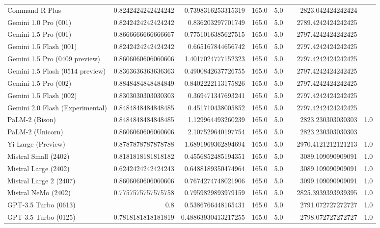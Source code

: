 \begin{table}[htp]
{\begin{tabular}{lrrrrrrr}
Command R Plus & 0.8242424242424242 & 0.7398316253315319 & 165.0 & 5.0 &  & 2823.042424242424 &  \\
Gemini 1.0 Pro (001) & 0.8242424242424242 & 0.836203297701749 & 165.0 & 5.0 &  & 2789.4242424242425 &  \\
Gemini 1.5 Pro (001) & 0.8666666666666667 & 0.7751016385627515 & 165.0 & 5.0 &  & 2797.4242424242425 &  \\
Gemini 1.5 Flash (001) & 0.8242424242424242 & 0.665167844656742 & 165.0 & 5.0 &  & 2797.4242424242425 &  \\
Gemini 1.5 Pro (0409 preview) & 0.8606060606060606 & 1.4017024777152323 & 165.0 & 5.0 &  & 2797.4242424242425 &  \\
Gemini 1.5 Flash (0514 preview) & 0.8363636363636363 & 0.4900842637726755 & 165.0 & 5.0 &  & 2797.4242424242425 &  \\
Gemini 1.5 Pro (002) & 0.8848484848484849 & 0.8402222113175826 & 165.0 & 5.0 &  & 2797.4242424242425 &  \\
Gemini 1.5 Flash (002) & 0.8303030303030303 & 0.369471347693241 & 165.0 & 5.0 &  & 2797.4242424242425 &  \\
Gemini 2.0 Flash (Experimental) & 0.8484848484848485 & 0.451710438005852 & 165.0 & 5.0 &  & 2797.4242424242425 &  \\
PaLM-2 (Bison) & 0.8484848484848485 & 1.129964493260239 & 165.0 & 5.0 &  & 2823.230303030303 & 1.0 \\
PaLM-2 (Unicorn) & 0.8606060606060606 & 2.107529640197754 & 165.0 & 5.0 &  & 2823.230303030303 &  \\
Yi Large (Preview) & 0.8787878787878788 & 1.6891969362894694 & 165.0 & 5.0 &  & 2970.4121212121213 & 1.0 \\
Mistral Small (2402) & 0.8181818181818182 & 0.4556852485194351 & 165.0 & 5.0 &  & 3089.109090909091 & 1.0 \\
Mistral Large (2402) & 0.6242424242424243 & 0.6488189350474964 & 165.0 & 5.0 &  & 3089.109090909091 & 1.0 \\
Mistral Large 2 (2407) & 0.8606060606060606 & 0.7674274748021906 & 165.0 & 5.0 &  & 3099.109090909091 & 1.0 \\
Mistral NeMo (2402) & 0.7757575757575758 & 0.7959829893979159 & 165.0 & 5.0 &  & 2825.3939393939395 & 1.0 \\
GPT-3.5 Turbo (0613) & 0.8 & 0.5386766448165431 & 165.0 & 5.0 &  & 2791.072727272727 & 1.0 \\
GPT-3.5 Turbo (0125) & 0.7818181818181819 & 0.48863930413217255 & 165.0 & 5.0 &  & 2798.072727272727 & 1.0 \\

\end{tabular}}
\end{table}
